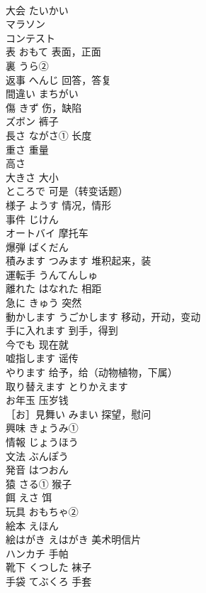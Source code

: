 \documentclass[8pt]{extreport}
\begin{document}
\begin{CJK}{UTF8}{min}
\\	大会	たいかい	
\\	マラソン		
\\	コンテスト	
\\	表	おもて 表面，正面	
\\	裏	うら②	
\\	返事	へんじ 回答，答复	
\\	間違い	まちがい	
\\	傷	きず 伤，缺陷	
\\	ズボン	裤子	
\\	長さ	ながさ① 长度	
\\	重さ	重量	
\\	高さ	
\\	大きさ	大小	
\\	ところで	可是（转变话题）	
\\	様子	ようす 情况，情形	
\\	事件	じけん	
\\	オートバイ	摩托车	
\\	爆弾	ばくだん	
\\	積みます	つみます 堆积起来，装	
\\	運転手	うんてんしゅ	
\\	離れた	はなれた 相距	
\\	急に	きゅう 突然	
\\	動かします	うごかします 移动，开动，变动	
\\	手に入れます	到手，得到	
\\	今でも	现在就	
\\	嘘指します	谣传	
\\	やります	给予，给（动物植物，下属）	
\\	取り替えます	とりかえます	
\\	お年玉	压岁钱	
\\	［お］見舞い	みまい 探望，慰问	
\\	興味	きょうみ①	
\\	情報	じょうほう	
\\	文法	ぶんぽう	
\\	発音	はつおん	
\\	猿	さる① 猴子	
\\	餌	えさ 饵	
\\	玩具	おもちゃ②	
\\	絵本	えほん	
\\	絵はがき	えはがき 美术明信片	
\\	ハンカチ	手帕	
\\	靴下	くつした 袜子	
\\	手袋	てぶくろ 手套	

\end{CJK}
\end{document}

